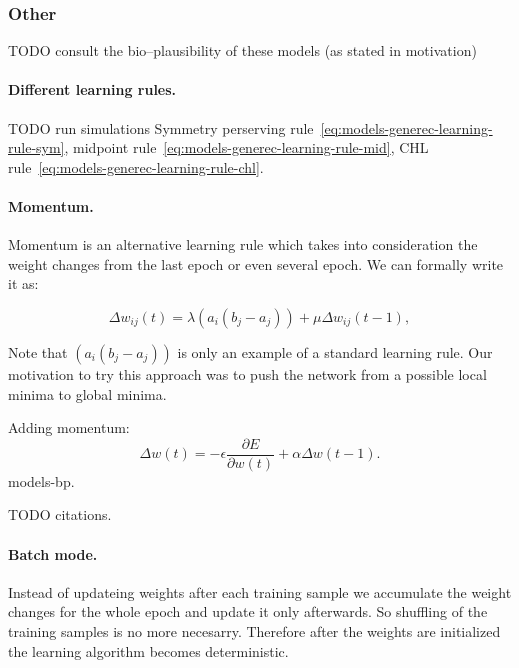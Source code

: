 
\subsubsection{Other}
TODO consult the bio--plausibility of these models (as stated in motivation) 

\paragraph{Different learning rules.}
\label{sec:our-learning-rules}

TODO run simulations 
Symmetry perserving rule~\ref{eq:models-generec-learning-rule-sym}, midpoint rule~\ref{eq:models-generec-learning-rule-mid}, CHL rule~\ref{eq:models-generec-learning-rule-chl}. 


\paragraph{Momentum.}
\label{sec:our-momentum}

Momentum is an alternative learning rule which takes into consideration the weight changes from the last epoch or even several epoch. We can formally write it as: 

\begin{equation}
\Delta w_{ij}(t) = \lambda (a_i(b_j - a_j)) + \mu \Delta w_{ij}(t-1), 
\end{equation} 

Note that $(a_i(b_j - a_j))$ is only an example of a standard learning rule. Our motivation to try this approach was to push the network from a possible local minima to global minima. 

Adding momentum:
$$
\Delta w(t) = -\epsilon \frac{\partial E}{\partial w(t)} + \alpha \Delta w(t-1).
$$
models-bp. 


TODO citations.  

\paragraph{Batch mode.}

Instead of updateing weights after each training sample we accumulate the weight changes for the whole epoch and update it only afterwards. So shuffling of the training samples is no more necesarry. Therefore after the weights are initialized the learning algorithm becomes deterministic.

